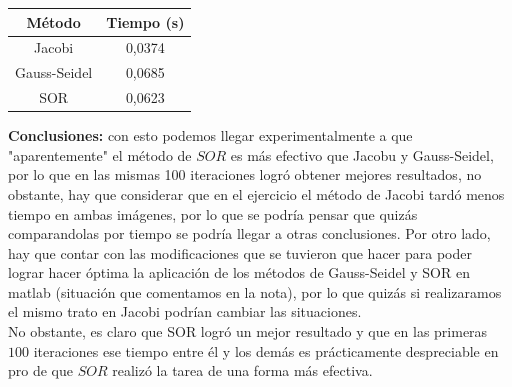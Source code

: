 \begin{homeworkProblem}
\begin{solucion}
    \begin{center}
      \begin{tabular}{|c|c|}
        \hline
        Método & Tiempo (s)\\
        \hline
        Jacobi & 0,0374\\
        \hline
        Gauss-Seidel & 0,0685\\
        \hline
        SOR & 0,0623\\
        \hline
      \end{tabular}        
    \end{center}
    \textbf{Conclusiones:} con esto podemos llegar experimentalmente a que "aparentemente" el método de $SOR$ es más efectivo que Jacobu y Gauss-Seidel, por lo que en las mismas 100 iteraciones logró obtener mejores resultados, no obstante, hay que considerar que en el ejercicio el método de Jacobi tardó menos tiempo en ambas imágenes, por lo que se podría pensar que quizás comparandolas por tiempo se podría llegar a otras conclusiones. Por otro lado, hay que contar con las modificaciones que se tuvieron que hacer para poder lograr hacer óptima la aplicación de los métodos de Gauss-Seidel y SOR en matlab (situación que comentamos en la nota), por lo que quizás si realizaramos el mismo trato en Jacobi podrían cambiar las situaciones.\\
    No obstante, es claro que SOR logró un mejor resultado y que en las primeras $100$ iteraciones ese tiempo entre él y los demás es prácticamente despreciable en pro de que $SOR$ realizó la tarea de una forma más efectiva. 
  \end{solucion}
\end{homeworkProblem}
